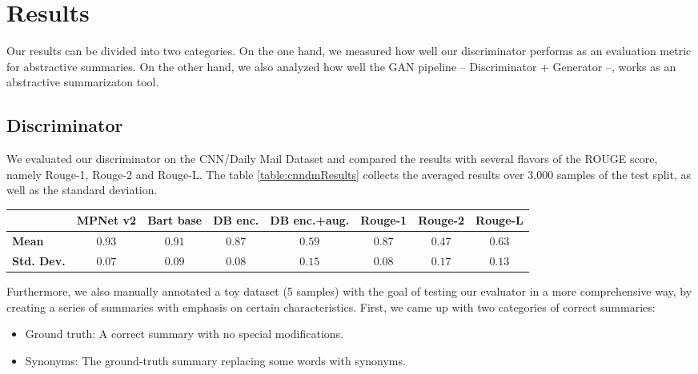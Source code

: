 \documentclass[11pt]{article}
\begin{document}

\section{Results} \label{Results}

Our results can be divided into two categories. On the one hand, we measured how well our discriminator performs as an evaluation metric for abstractive summaries. On the other hand, we also analyzed how well the GAN pipeline -- Discriminator + Generator 
--, works as an abstractive summarizaton tool.

\subsection{Discriminator} 

We evaluated our discriminator on the CNN/Daily Mail Dataset and compared the results with several flavors of the ROUGE score, namely Rouge-1, Rouge-2 and Rouge-L. The table \ref{table:cnndmResults} collects the averaged results over 3,000 samples of the test split, as well as the standard deviation.

\begin{table*}
\centering
\begin{tabular}{lccccccc}
\hline
\textbf{} & \textbf{MPNet v2} & \textbf{Bart base}  & \textbf{DB enc.} & \textbf{DB enc.+aug.} & \textbf{Rouge-1} & \textbf{Rouge-2} & \textbf{Rouge-L} \\
\hline
\textbf{Mean} & $0.93$ & $0.91$ & $0.87$ & $0.59$ & $0.87$ & $0.47$ & $0.63$ \\
\textbf{Std. Dev.} & $0.07$ & $0.09$ & $0.08$ & $0.15$ & $0.08$ & $0.17$ & $0.13$ \\
\hline
\end{tabular}
\caption{\label{table:cnndmResults}
Averaged results over 3,000 individual evaluations on the CNN/Daily Mail dataset. ``DB enc.'' stands for ``Distilbart Encoder'', and ``aug.'' refers to using augmentation.
}
\end{table*}

Furthermore, we also manually annotated a toy dataset (5 samples) with the goal of testing our evaluator in a more comprehensive way, by creating a series of summaries with emphasis on certain characteristics. First, we came up with two categories of correct summaries:

\begin{itemize}
    \item Ground truth: A correct summary with no special modifications.
    \item Synonyms: The ground-truth summary replacing some words with synonyms.
\end{itemize}
\end{document}
